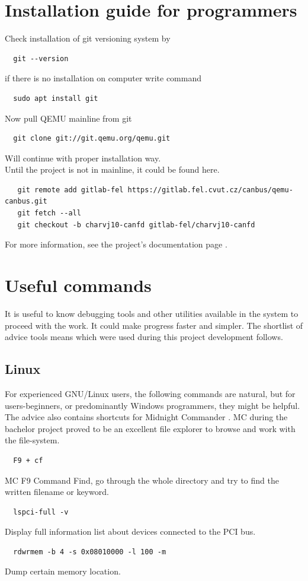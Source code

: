 \documentclass{ctuthesis}
\begin{document}
\chapter{Installation guide for programmers}
  Check installation of git versioning system by
  \begin{verbatim}  git --version\end{verbatim}
  if there is no installation on computer write command
  \begin{verbatim}  sudo apt install git\end{verbatim}
  Now pull QEMU mainline from git
 \begin{verbatim}  git clone git://git.qemu.org/qemu.git\end{verbatim}
  Will continue with proper installation way. \\
  Until the project is not in mainline, it could be found here.
  \begin{verbatim}   git remote add gitlab-fel https://gitlab.fel.cvut.cz/canbus/qemu-canbus.git
   git fetch --all
   git checkout -b charvj10-canfd gitlab-fel/charvj10-canfd\end{verbatim}
   For more information, see the project's documentation page \cite{project-doc}.

\chapter{Useful commands}
  It is useful to know debugging tools and other utilities available in the system to proceed with the work. It could make progress faster and simpler. The shortlist of advice tools means  which were used during this project development follows.
 \section{Linux}
  For experienced GNU/Linux users, the following commands are natural, but for users-beginners, or predominantly Windows programmers, they might be helpful. The advice also contains shortcuts for Midnight Commander \cite{mc}. MC during the bachelor project proved to be an excellent file explorer to browse and work with the file-system.
  \begin{verbatim}  F9 + cf\end{verbatim}
  MC F9 Command Find, go through the whole directory and try to find the written filename or keyword.
  \begin{verbatim}  lspci-full -v\end{verbatim}
  Display full information list about devices connected to the PCI bus.
  \begin{verbatim}  rdwrmem -b 4 -s 0x08010000 -l 100 -m\end{verbatim}
  Dump certain memory location. \cite{rdwrmem}

 
\end{document}
